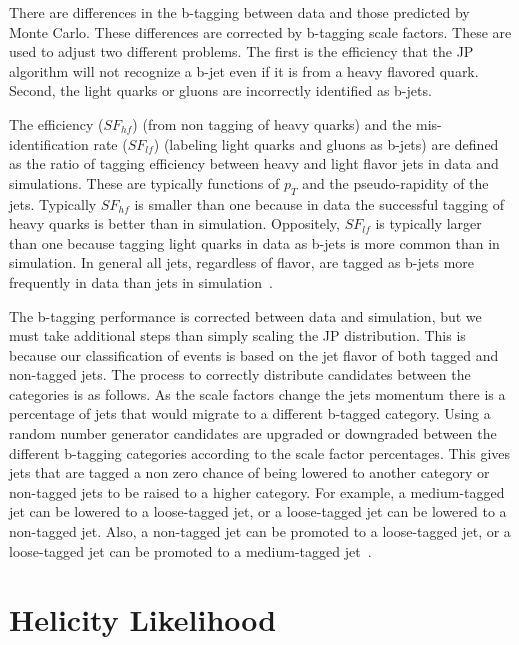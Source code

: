 There are differences in the b-tagging between data and those predicted by Monte Carlo.  These differences are corrected by b-tagging scale factors.  These are used to adjust two different problems.  The first is the efficiency that the JP algorithm will not recognize a b-jet even if it is from a heavy flavored quark.  Second, the light quarks or gluons are incorrectly identified as b-jets.  

The efficiency ($SF_{hf}$) (from non tagging of heavy quarks) and the mis-identification rate ($SF_{lf}$) (labeling light quarks and gluons as b-jets) are defined as the ratio of tagging efficiency between heavy and light flavor jets in data and simulations.  These are typically functions of $p_T$ and the pseudo-rapidity of the jets.  Typically $SF_{hf}$ is smaller than one because in data the successful tagging of heavy quarks is better than in simulation.  Oppositely, $SF_{lf}$ is typically larger than one because tagging light quarks in data as b-jets is more common than in simulation.  In general all jets, regardless of flavor, are tagged as b-jets more frequently in data than jets in simulation~\cite{CMS-PAS-BTV-11-004}.

The b-tagging performance is corrected between data and simulation, but we must take additional steps than simply scaling the JP distribution.  This is because our classification of events is based on the jet flavor of both tagged and non-tagged jets.  The process to correctly distribute candidates between the categories is as follows.  As the scale factors change the jets momentum there is a percentage of jets that would migrate to a different b-tagged category. Using a random number generator candidates are upgraded or downgraded between the different b-tagging categories according to the scale factor percentages. This gives jets that are tagged a non zero chance of being lowered to another category or non-tagged jets to be raised to a higher category.  For example, a medium-tagged jet can be lowered to a loose-tagged jet, or a loose-tagged jet can be lowered to a non-tagged jet.  Also, a non-tagged jet can be promoted to a loose-tagged jet, or a loose-tagged jet can be promoted to a medium-tagged jet~\cite{2l2q115}.


\section{Helicity Likelihood}

